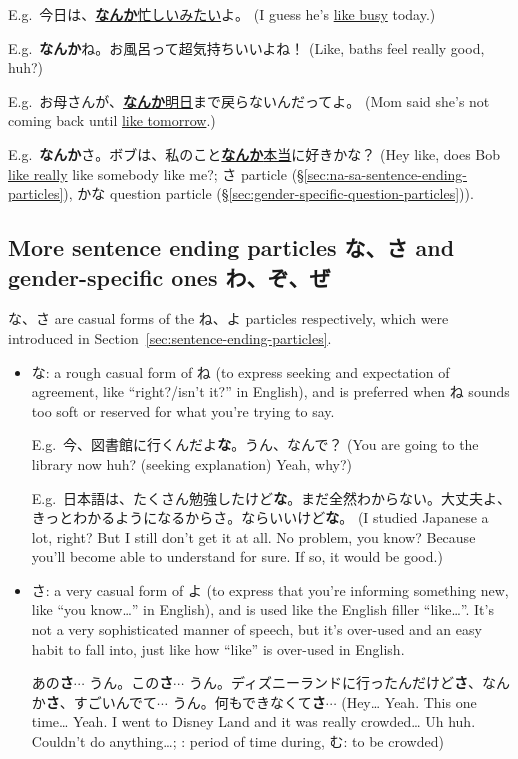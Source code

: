 \documentclass[../nihongo-gakushuu-kyouzai-grammar.tex]{subfiles}
\begin{document}
E.g.\ 今日は、\ul{\textbf{なんか}忙しいみたい}よ。 (I guess he's \ul{like busy} today.)

E.g.\ \textbf{なんか}ね。お風呂って超気持ちいいよね！ (Like, baths feel really good, huh?)

E.g.\ お母さんが、\ul{\textbf{なんか}明日}まで戻らないんだってよ。 (Mom said she's not coming back until \ul{like tomorrow}.)

E.g.\ \textbf{なんか}さ。ボブは、私のこと\ul{\textbf{なんか}本当}に好きかな？ (Hey like, does Bob \ul{like really} like somebody like me?; さ particle (\S\ref{sec:na-sa-sentence-ending-particles}), かな question particle (\S\ref{sec:gender-specific-question-particles})).


\subsection{More sentence ending particles な、さ and gender-specific ones わ、ぞ、ぜ} \label{sec:na-sa-wa-zo-ze-sentence-ending-particles}
な、さ are casual forms of the ね、よ particles respectively, which were introduced in Section~\ref{sec:sentence-ending-particles}.

\begin{itemize}
    \item な: a rough casual form of ね (to express seeking and expectation of agreement, like ``right?/isn't it?'' in English), and is preferred when ね sounds too soft or reserved for what you're trying to say.

    E.g.\ 今、図書館に行くんだよ\textbf{な}。うん、なんで？ (You are going to the library now huh? (seeking explanation) Yeah, why?)

    E.g.\ 日本語は、たくさん勉強したけど\textbf{な}。まだ全然わからない。大丈夫よ、きっとわかるようになるからさ。ならいいけど\textbf{な}。 (I studied Japanese a lot, right? But I still don't get it at all. No problem, you know? Because you'll become able to understand for sure. If so, it would be good.)

    \item さ: a very casual form of よ (to express that you're informing something new, like ``you know\dots'' in English), and is used like the English filler ``like\dots''. It's not a very sophisticated manner of speech, but it's over-used and an easy habit to fall into, just like how ``like'' is over-used in English.

    あの\textbf{さ}$\cdots$ うん。この\textbf{さ}$\cdots$ うん。ディズニーランドに行ったんだけど\textbf{さ}、なんか\textbf{さ}、すごいんでて$\cdots$ うん。何もできなくて\textbf{さ}$\cdots$ (Hey\dots{} Yeah. This one time\dots{} Yeah. I went to Disney Land and it was really crowded\dots{} Uh huh. Couldn't do anything\dots{}; : period of time during, む: to be crowded)
\end{itemize}
\end{document}
